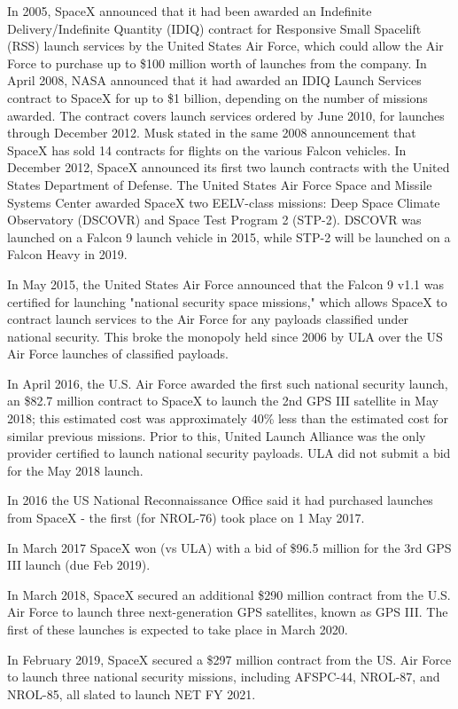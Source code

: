 In 2005, SpaceX announced that it had been awarded an Indefinite
Delivery/Indefinite Quantity (IDIQ) contract for Responsive Small
Spacelift (RSS) launch services by the United States Air Force, which
could allow the Air Force to purchase up to \$100 million worth of
launches from the company. In April 2008, NASA announced that it had
awarded an IDIQ Launch Services contract to SpaceX for up to \$1
billion, depending on the number of missions awarded. The contract
covers launch services ordered by June 2010, for launches through
December 2012. Musk stated in the same 2008 announcement that SpaceX has
sold 14 contracts for flights on the various Falcon vehicles. In
December 2012, SpaceX announced its first two launch contracts with the
United States Department of Defense. The United States Air Force Space
and Missile Systems Center awarded SpaceX two EELV-class missions: Deep
Space Climate Observatory (DSCOVR) and Space Test Program 2 (STP-2).
DSCOVR was launched on a Falcon 9 launch vehicle in 2015, while STP-2
will be launched on a Falcon Heavy in 2019.

In May 2015, the United States Air Force announced that the Falcon 9
v1.1 was certified for launching "national security space missions,"
which allows SpaceX to contract launch services to the Air Force for any
payloads classified under national security. This broke the monopoly
held since 2006 by ULA over the US Air Force launches of classified
payloads.

In April 2016, the U.S. Air Force awarded the first such national
security launch, an \$82.7 million contract to SpaceX to launch the 2nd
GPS III satellite in May 2018; this estimated cost was approximately
40\% less than the estimated cost for similar previous missions. Prior
to this, United Launch Alliance was the only provider certified to
launch national security payloads. ULA did not submit a bid for the May
2018 launch.

In 2016 the US National Reconnaissance Office said it had purchased
launches from SpaceX - the first (for NROL-76) took place on 1 May 2017.

In March 2017 SpaceX won (vs ULA) with a bid of \$96.5 million for the
3rd GPS III launch (due Feb 2019).

In March 2018, SpaceX secured an additional \$290 million contract from
the U.S. Air Force to launch three next-generation GPS satellites, known
as GPS III. The first of these launches is expected to take place in
March 2020.

In February 2019, SpaceX secured a \$297 million contract from the US.
Air Force to launch three national security missions, including
AFSPC-44, NROL-87, and NROL-85, all slated to launch NET FY 2021.

